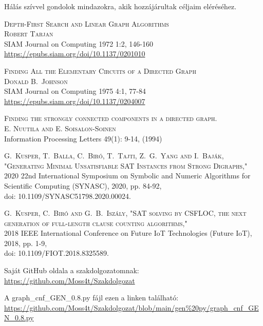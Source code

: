 \documentclass[
]{thesis-ekf}
\theoremstyle{definition}
\theoremstyle{remark}
\begin{document}
	Hálás szívvel gondolok mindazokra, akik hozzájárultak céljaim eléréséhez.
	
\begin{thebibliography}{2}
	\textsc{Depth-First Search and Linear Graph Algorithms
	\\Robert Tarjan}
	\\SIAM Journal on Computing 1972 1:2, 146-160
	\\\url{https://epubs.siam.org/doi/10.1137/0201010}

	\textsc{Finding All the Elementary Circuits of a Directed Graph
	\\Donald B.~Johnson}
	\\SIAM Journal on Computing 1975 4:1, 77-84
	\\\url{https://epubs.siam.org/doi/10.1137/0204007}
	
	\textsc{Finding the strongly connected components in a directed graph.}
	\\\textsc{E. Nuutila and E. Soisalon-Soinen }
	\\Information Processing Letters 49(1): 9-14, (1994)
	
	\textsc{G.~Kusper, T.~Balla, C.~Biró, T.~Tajti, Z.~G.~Yang and I.~Baják, "Generating Minimal Unsatisfiable SAT Instances from Strong Digraphs,"}
	\\2020 22nd International Symposium on Symbolic and Numeric Algorithms for Scientific Computing (SYNASC), 2020, pp. 84-92, 
	\\doi: 10.1109/SYNASC51798.2020.00024.
	
	\textsc{G.~Kusper, C.~Biró and G.~B.~Iszály, "SAT solving by CSFLOC, the next generation of full-length clause counting algorithms,"}
	\\2018 IEEE International Conference on Future IoT Technologies (Future IoT), 2018, pp. 1-9, 
	\\doi: 10.1109/FIOT.2018.8325589.
	
	Saját GitHub oldala a szakdolgozatomnak:
	\\\url{https://github.com/Moss4t/Szakdolgozat}
	
	A graph\_cnf\_GEN\_0.8.py fájl ezen a linken található:
	\\\url{https://github.com/Moss4t/Szakdolgozat/blob/main/gen%20py/graph_cnf_GEN_0.8.py}
		

\end{thebibliography}
\end{document}
